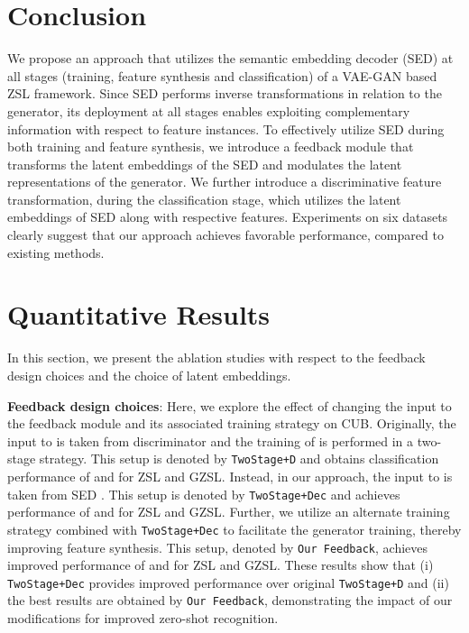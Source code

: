 \documentclass[runningheads]{llncs}
\begin{document}
\section{Conclusion}
We propose an approach that utilizes the semantic embedding decoder (SED) at all stages (training, feature synthesis and classification) of a VAE-GAN based ZSL framework. Since SED performs inverse transformations in relation to the generator, its deployment at all stages enables exploiting complementary information with respect to feature instances. To effectively utilize SED during both training and feature synthesis, we introduce a feedback module that transforms the latent embeddings of the SED and modulates the latent representations of the generator. We further introduce a discriminative feature transformation, during the classification stage, which utilizes the latent embeddings of SED along with respective features. Experiments on six datasets clearly suggest that our approach achieves favorable performance, compared to existing methods.



{\small


}

\clearpage

\appendix
\section{Quantitative Results\label{sec_quant_res}}
In this section, we present the ablation studies with respect to the feedback design choices and the choice of latent embeddings.

\noindent\textbf{Feedback design choices}:
Here, we explore the effect of changing the input to the feedback module  and its associated training strategy on CUB. Originally, the input to  is taken from discriminator  and the training of  is performed in a two-stage strategy. This setup is denoted by \texttt{TwoStage+D} and obtains classification performance of  and  for ZSL and GZSL. Instead, in our approach, the input to  is taken from SED . This setup is denoted by \texttt{TwoStage+Dec} and achieves performance of  and  for ZSL and GZSL. Further, we utilize an alternate training strategy combined with \texttt{TwoStage+Dec} to facilitate the generator training, thereby improving feature synthesis. This setup, denoted by \texttt{Our Feedback}, achieves improved performance of  and  for ZSL and GZSL. These results show that (i) \texttt{TwoStage+Dec} provides improved performance over original \texttt{TwoStage+D} and (ii) the best results are obtained by \texttt{Our Feedback}, demonstrating the impact of our modifications for improved zero-shot recognition.
\end{document}
